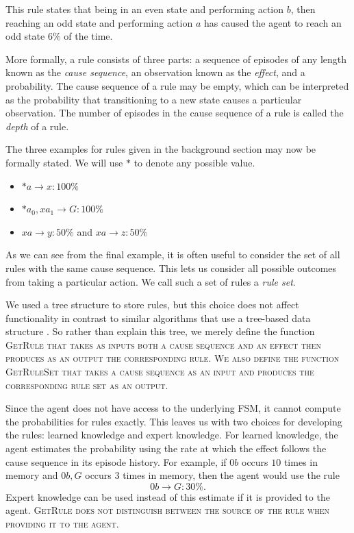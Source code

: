 \documentclass[letterpaper]{article} %
\begin{document}
This rule states that being in an even state and performing action
$b$, then reaching an odd state and performing action $a$ has caused
the agent to reach an odd state $6\%$ of the time.


More formally, a rule consists of three parts: a sequence of episodes of any length known as the \emph{cause sequence}, an observation known as the \emph{effect}, and a probability. The cause sequence of a rule may be empty, which can be interpreted as the probability  that transitioning to a new state causes a particular observation. The number of episodes in the cause sequence of a rule is called the \textit{depth} of a rule.

The three examples for rules given in the background section may now be formally stated. We will use $*$ to denote any possible value.
\begin{itemize}
	\item $*a \rightarrow x: 100\%$
	\item $*a_0, xa_1 \rightarrow G: 100\%$
	\item $xa \rightarrow y: 50\%$ and $xa \rightarrow z: 50\%$
\end{itemize}

As we can see from the final example, it is often useful to consider
the set of all rules with the same cause sequence. This lets us
consider all possible outcomes from taking a particular action. We
call such a set of rules a \textit{rule set}.

We used a tree structure to store rules, but this choice does not
affect functionality in contrast to similar algorithms that use a
tree-based data structure \cite{McCallumUSM95,Shani2005}. So rather
than explain this tree, we merely define the function \scshape
GetRule \normalfont that takes as inputs both a cause sequence and an
effect then produces as an output the corresponding rule. We also
define the function \scshape GetRuleSet \normalfont that takes a
cause sequence as an input and produces the corresponding rule set
as an output.

Since the agent does not have access to the underlying FSM, it cannot
compute the probabilities for rules exactly. This leaves us with two
choices for developing the rules: learned knowledge and expert
knowledge. For learned knowledge, the agent estimates the probability
using the rate at which the effect follows the cause sequence in its
episode history. For example, if $0b$ occurs $10$ times in memory and
$0b,G$ occurs $3$ times in memory, then the agent would use the
rule $$0b \rightarrow G: 30\%.$$ Expert knowledge can be used instead
of this estimate if it is provided to the agent. \scshape
GetRule \normalfont does not distinguish between the source of the
rule when providing it to the agent.
\end{document}
